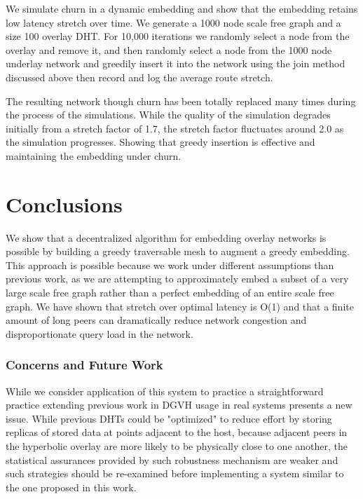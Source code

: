 We simulate churn in a dynamic embedding and show that the embedding retains low latency stretch over time. We generate a 1000 node scale free graph and a size 100 overlay DHT. For 10,000 iterations we randomly select a node from the overlay and remove it, and then randomly select a node from the 1000 node underlay network and greedily insert it into the network using the join method discussed above then record and log the average route stretch.

The resulting network though churn has been totally replaced many times during the process of the simulations. 
While the quality of the simulation degrades initially from a stretch factor of 1.7, the stretch factor fluctuates around 2.0 as the simulation progresses.
Showing that greedy insertion is effective and maintaining the embedding under churn.


\section{Conclusions}
We show that a decentralized algorithm for embedding overlay networks is possible by building a greedy traversable mesh to augment a greedy embedding.
This approach is possible because we work under different assumptions than previous work, as we are attempting to approximately embed a subset of a very large scale free graph rather than a perfect embedding of an entire scale free graph.
We have shown that stretch over optimal latency is O(1) and that a finite amount of long peers can dramatically reduce network congestion and disproportionate query load in the network.

\subsubsection{Concerns and Future Work}

While we consider application of this system to practice a straightforward practice extending previous work in DGVH\cite{dgvh} usage in real systems presents a new issue.
While previous DHTs could be "optimized" to reduce effort by storing replicas of stored data at points adjacent to the host, because adjacent peers in the hyperbolic overlay are more likely to be physically close to one another, the statistical assurances provided by such robustness mechanism are weaker and such strategies should be re-examined before implementing a system similar to the one proposed in this work.






